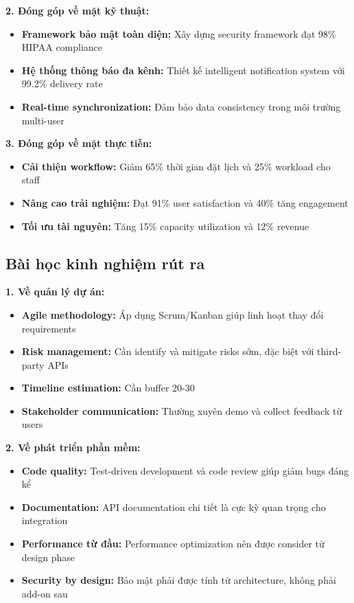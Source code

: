 \documentclass[../DoAn.tex]{subfiles}
\begin{document}
\textbf{2. Đóng góp về mặt kỹ thuật:}
\begin{itemize}
    \item \textbf{Framework bảo mật toàn diện:} Xây dựng security framework đạt 98\% HIPAA compliance
    \item \textbf{Hệ thống thông báo đa kênh:} Thiết kế intelligent notification system với 99.2\% delivery rate
    \item \textbf{Real-time synchronization:} Đảm bảo data consistency trong môi trường multi-user
\end{itemize}

\textbf{3. Đóng góp về mặt thực tiễn:}
\begin{itemize}
    \item \textbf{Cải thiện workflow:} Giảm 65\% thời gian đặt lịch và 25\% workload cho staff
    \item \textbf{Nâng cao trải nghiệm:} Đạt 91\% user satisfaction và 40\% tăng engagement
    \item \textbf{Tối ưu tài nguyên:} Tăng 15\% capacity utilization và 12\% revenue
\end{itemize}

\subsection{Bài học kinh nghiệm rút ra}

\textbf{1. Về quản lý dự án:}
\begin{itemize}
    \item \textbf{Agile methodology:} Áp dụng Scrum/Kanban giúp linh hoạt thay đổi requirements
    \item \textbf{Risk management:} Cần identify và mitigate risks sớm, đặc biệt với third-party APIs
    \item \textbf{Timeline estimation:} Cần buffer 20-30%
    \item \textbf{Stakeholder communication:} Thường xuyên demo và collect feedback từ users
\end{itemize}

\textbf{2. Về phát triển phần mềm:}
\begin{itemize}
    \item \textbf{Code quality:} Test-driven development và code review giúp giảm bugs đáng kể
    \item \textbf{Documentation:} API documentation chi tiết là cực kỳ quan trọng cho integration
    \item \textbf{Performance từ đầu:} Performance optimization nên được consider từ design phase
    \item \textbf{Security by design:} Bảo mật phải được tính từ architecture, không phải add-on sau
\end{itemize}
\end{document}
